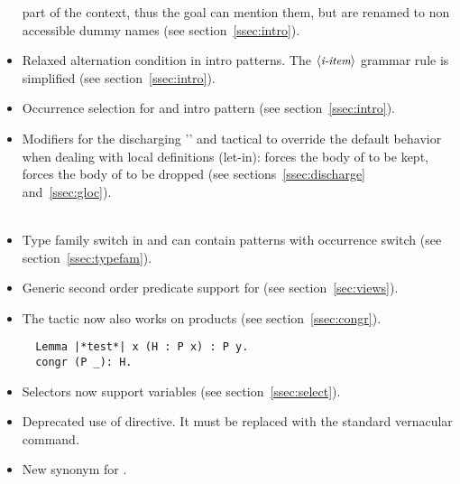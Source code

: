 \begin{itemize}
      part of the context, thus the goal can mention them, but are
      renamed to non accessible dummy names (see section~\ref{ssec:intro}).\\
\item Relaxed alternation condition in intro patterns. The
      $\langle\mbox{\itshape\rmfamily\small i-item}\rangle$ grammar rule is simplified (see section~\ref{ssec:intro}).\\
\item Occurrence selection for \C{->} and \C{<-} intro pattern
       (see section~\ref{ssec:intro}).\\
\item Modifiers for the discharging '\C{:}' and  tactical to override
      the default behavior when dealing with local definitions (let-in):
       forces the body of  to be kept,  forces the body of
       to be dropped  (see sections~\ref{ssec:discharge}
      and~\ref{ssec:gloc}).\\
      \\
\item Type family switch in  and 
      can contain patterns with occurrence switch
      (see section~\ref{ssec:typefam}).\\
\item Generic second order predicate support for 
      (see section~\ref{sec:views}).\\
\item The  tactic now also works on products (see
      section~\ref{ssec:congr}).
\begin{lstlisting}
  Lemma |*test*| x (H : P x) : P y.
  congr (P _): H.
\end{lstlisting}
\item Selectors now support \Ltac{} variables
      (see section~\ref{ssec:select}).\\
\item Deprecated use of  directive.
      It must be replaced with the standard \Coq{}  vernacular command.
\item New synonym  for .
\end{itemize}
